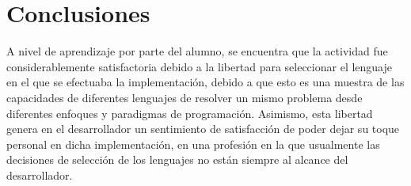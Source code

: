 \documentclass[stu, 12pt, letterpaper, donotrepeattitle, floatsintext, natbib]{apa7}
\begin{document}
\section{\large Conclusiones}
A nivel de aprendizaje por parte del alumno, se encuentra que la actividad fue considerablemente satisfactoria debido a la libertad para seleccionar el lenguaje en el que se efectuaba la implementación, debido a que esto es una muestra de las capacidades de diferentes lenguajes de resolver un mismo problema desde diferentes enfoques y paradigmas de programación. Asimismo, esta libertad genera en el desarrollador un sentimiento de satisfacción de poder dejar su toque personal en dicha implementación, en una profesión en la que usualmente las decisiones de selección de los lenguajes no están siempre al alcance del desarrollador.



\newpage
\renewcommand\refname{\large\textbf{Referencias}}

\end{document}
